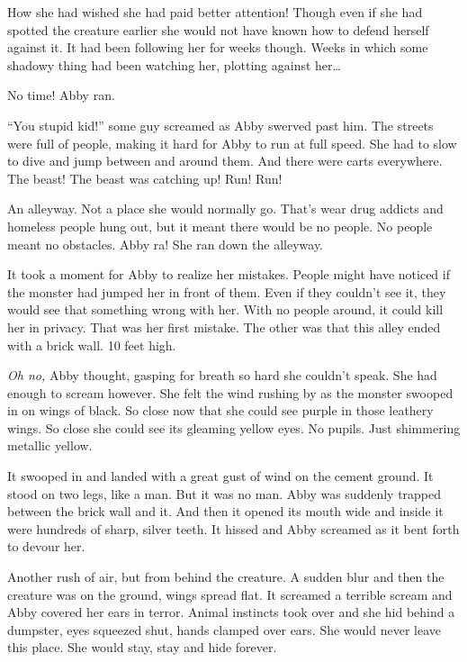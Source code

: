 How she had wished she had paid better attention! Though even if
she had spotted the creature earlier she would not have known how
to defend herself against it. It had been following her for weeks
though. Weeks in which some shadowy thing had been watching her,
plotting against her{\ldots}



No time! Abby ran.



``You stupid kid!'' some guy screamed as Abby swerved past him. The
streets were full of people, making it hard for Abby to run at full
speed. She had to slow to dive and jump between and around them.
And there were carts everywhere. The beast! The beast was catching
up! Run! Run!



An alleyway. Not a place she would normally go. That's wear drug
addicts and homeless people hung out, but it meant there would be
no people. No people meant no obstacles. Abby ra! She ran down the
alleyway.



It took a moment for Abby to realize her mistakes. People might
have noticed if the monster had jumped her in front of them. Even
if they couldn't see it, they would see that something wrong with
her. With no people around, it could kill her in privacy. That was
her first mistake. The other was that this alley ended with a brick
wall. 10 feet high.



{\em Oh no,} Abby thought, gasping for breath so hard she couldn't
speak. She had enough to scream however. She felt the wind rushing
by as the monster swooped in on wings of black. So close now that
she could see purple in those leathery wings. So close she could
see its gleaming yellow eyes. No pupils. Just shimmering metallic
yellow.



It swooped in and landed with a great gust of wind on the cement
ground. It stood on two legs, like a man. But it was no man. Abby
was suddenly trapped between the brick wall and it. And then it
opened its mouth wide and inside it were hundreds of sharp, silver
teeth. It hissed and Abby screamed as it bent forth to devour
her.



Another rush of air, but from behind the creature. A sudden blur
and then the creature was on the ground, wings spread flat. It
screamed a terrible scream and Abby covered her ears in terror.
Animal instincts took over and she hid behind a dumpster, eyes
squeezed shut, hands clamped over ears. She would never leave this
place. She would stay, stay and hide forever.



